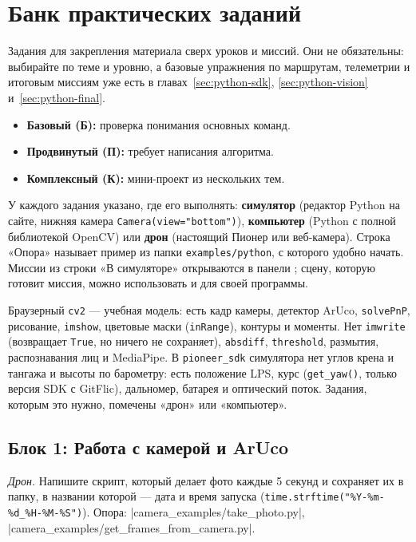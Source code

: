 \section{Банк практических заданий}
\label{sec:python-task-bank}

Задания для закрепления материала сверх уроков и миссий. Они не обязательны: выбирайте по теме и уровню, а базовые упражнения по маршрутам, телеметрии и итоговым миссиям уже есть в главах~\ref{sec:python-sdk}, \ref{sec:python-vision} и~\ref{sec:python-final}.
\begin{itemize}
    \item \textbf{Базовый (Б):} проверка понимания основных команд.
    \item \textbf{Продвинутый (П):} требует написания алгоритма.
    \item \textbf{Комплексный (К):} мини-проект из нескольких тем.
\end{itemize}

У каждого задания указано, где его выполнять: \textbf{симулятор} (редактор Python на сайте, нижняя камера \verb|Camera(view="bottom")|), \textbf{компьютер} (Python с полной библиотекой OpenCV) или \textbf{дрон} (настоящий Пионер или веб-камера). Строка «Опора» называет пример из папки \verb|examples/python|, с которого удобно начать. Миссии из строки «В симуляторе» открываются в панели ; сцену, которую готовит миссия, можно использовать и для своей программы.

\begin{infobox}
Браузерный \verb|cv2| --- учебная модель: есть кадр камеры, детектор ArUco, \verb|solvePnP|, рисование, \verb|imshow|, цветовые маски (\verb|inRange|), контуры и моменты. Нет \verb|imwrite| (возвращает \texttt{True}, но ничего не сохраняет), \verb|absdiff|, \verb|threshold|, размытия, распознавания лиц и MediaPipe. В \verb|pioneer_sdk| симулятора нет углов крена и тангажа и высоты по барометру: есть положение LPS, курс (\verb|get_yaw()|, только версия SDK с GitFlic), дальномер, батарея и оптический поток. Задания, которым это нужно, помечены «дрон» или «компьютер».
\end{infobox}

\subsection{Блок 1: Работа с камерой и ArUco}

\begin{taskbox}[(Б) Фотограф]
\emph{Дрон.} Напишите скрипт, который делает фото каждые 5 секунд и сохраняет их в папку, в названии которой --- дата и время запуска (\verb|time.strftime("%Y-%m-%d_%H-%M-%S")|).
Опора: \fpath|camera_examples/take_photo.py|, \fpath|camera_examples/get_frames_from_camera.py|.
\end{taskbox}

